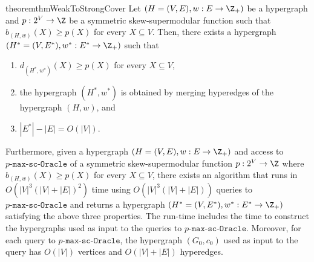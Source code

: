 \documentclass{article}
\newcommand{\functionMaximizationOracleStrongCover}[1]{\ensuremath{{#1}\text{-}\mathtt{max}\text{-}\mathtt{sc}\text{-}\mathtt{Oracle}}\xspace}
\begin{document}
\begin{restatable}{theorem}{thmWeakToStrongCover}\label{thm:WeakToStrongCover:main}
Let $(H=(V, E), w: E\rightarrow \Z_+)$ be a hypergraph and $p:2^V\rightarrow \Z$ be a symmetric skew-supermodular function such that 
$b_{(H, w)}(X) \geq p(X)$ for every $X \subseteq V$. 
Then, there exists a hypergraph \linebreak $\left(H^* = (V, E^*), w^*:E^* \rightarrow\Z_+\right)$ 
such that
\begin{enumerate}[label=$(\arabic*)$, ref=(\arabic*)]
    \item \label{thm:WeakToStrongCover:main:(1)} $d_{(H^*, w^*)}(X) \geq p(X)$ for every $X\subseteq V$,
    \item \label{thm:WeakToStrongCover:main:(2)} the hypergraph $(H^*,w^*)$ is obtained by merging hyperedges of the hypergraph $(H, w)$, and
    \item \label{thm:WeakToStrongCover:main:(3)} $|E^*| - |E| = O(|V|)$.
\end{enumerate}
Furthermore, given a hypergraph $(H=(V, E), w: E\rightarrow \Z_+)$ and access to \functionMaximizationOracleStrongCover{p} of a symmetric skew-supermodular function $p: 2^V\rightarrow \Z$ where $b_{(H, w)}(X)\ge p(X)$ for every $X\subseteq V$, there exists an algorithm that runs in $O(|V|^3(|V| + |E|)^2)$ time using $O(|V|^3(|V|+|E|))$ queries to \functionMaximizationOracleStrongCover{p} and returns a hypergraph $\left(H^* = (V, E^*), w^*:E^* \rightarrow\Z_+\right)$ satisfying the above three properties. The run-time includes the time to construct the hypergraphs used as input to the queries to \functionMaximizationOracleStrongCover{p}.
Moreover, for each query to \functionMaximizationOracleStrongCover{p}, the hypergraph $(G_0, c_0)$ used as input to the query has $O(|V|)$ vertices and $O(|V|+|E|)$ hyperedges.
\end{restatable}
\end{document}
